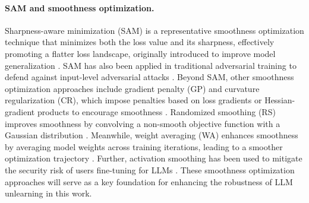 \paragraph{{SAM and smoothness optimization.}} 
Sharpness-aware minimization (SAM) is a representative smoothness optimization technique that minimizes both the loss value and its sharpness, effectively promoting a flatter loss landscape, originally introduced to improve model generalization \citep{foret2021sharpnessaware,andriushchenko2022towards,liu2022towards,du2022sharpness,zhang2023what,jiang2023adaptive}. SAM has also been applied in traditional adversarial training to defend against input-level adversarial attacks \citep{wei2023sharpness,zhang2024duality}.
Beyond SAM, other smoothness optimization approaches include gradient penalty (GP) and curvature regularization (CR), which impose penalties based on loss gradients or Hessian-gradient products to encourage smoothness \citep{dauphin2024neglected, zhao2024will}. Randomized smoothing (RS) improves smoothness by convolving a non-smooth objective function with a Gaussian distribution  \citep{duchi2012randomized, cohen2019certified, ji2024advancing}. Meanwhile, weight averaging (WA) enhances smoothness by averaging model weights across training iterations, leading to a smoother optimization trajectory \citep{izmailov2018averaging}. Further, activation smoothing has been used to mitigate the security risk of users fine-tuning for LLMs \citep{huang2024vaccine}. These smoothness optimization approaches will serve as a key foundation for enhancing the robustness of LLM unlearning in this work.


